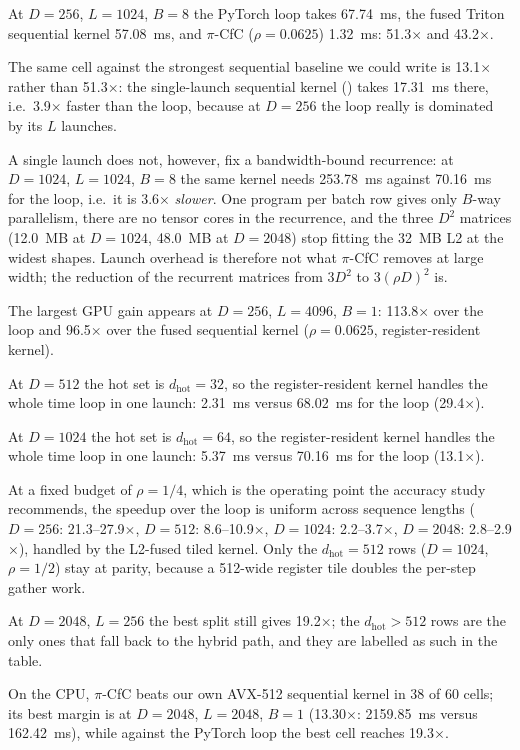 At $D=256$, $L=1024$, $B=8$ the PyTorch loop takes 67.74~ms, the fused Triton sequential kernel 57.08~ms, and $\pi$-CfC ($\rho=0.0625$) 1.32~ms: 51.3$\times$ and 43.2$\times$.

The same cell against the strongest sequential baseline we could write is 13.1$\times$ rather than 51.3$\times$: the single-launch sequential kernel () takes 17.31~ms there, i.e.\ 3.9$\times$ faster than the loop, because at $D=256$ the loop really is dominated by its $L$ launches.

A single launch does not, however, fix a bandwidth-bound recurrence: at $D=1024$, $L=1024$, $B=8$ the same kernel needs 253.78~ms against 70.16~ms for the loop, i.e.\ it is 3.6$\times$ \emph{slower}. One program per batch row gives only $B$-way parallelism, there are no tensor cores in the recurrence, and the three $D^2$ matrices (12.0~MB at $D=1024$, 48.0~MB at $D=2048$) stop fitting the 32~MB L2 at the widest shapes. Launch overhead is therefore not what $\pi$-CfC removes at large width; the reduction of the recurrent matrices from $3D^2$ to $3(\rho D)^2$ is.

The largest GPU gain appears at $D=256$, $L=4096$, $B=1$: 113.8$\times$ over the loop and 96.5$\times$ over the fused sequential kernel ($\rho=0.0625$, register-resident kernel).

At $D=512$ the hot set is $d_{\text{hot}}=32$, so the register-resident kernel handles the whole time loop in one launch: 2.31~ms versus 68.02~ms for the loop (29.4$\times$).

At $D=1024$ the hot set is $d_{\text{hot}}=64$, so the register-resident kernel handles the whole time loop in one launch: 5.37~ms versus 70.16~ms for the loop (13.1$\times$).

At a fixed budget of $\rho=1/4$, which is the operating point the accuracy study recommends, the speedup over the loop is uniform across sequence lengths ($D=256$: 21.3--27.9$\times$, $D=512$: 8.6--10.9$\times$, $D=1024$: 2.2--3.7$\times$, $D=2048$: 2.8--2.9$\times$), handled by the L2-fused tiled kernel. Only the $d_{\text{hot}}=512$ rows ($D=1024$, $\rho=1/2$) stay at parity, because a 512-wide register tile doubles the per-step gather work.

At $D=2048$, $L=256$ the best split still gives 19.2$\times$; the $d_{\text{hot}}>512$ rows are the only ones that fall back to the hybrid path, and they are labelled as such in the table.

On the CPU, $\pi$-CfC beats our own AVX-512 sequential kernel in 38 of 60 cells; its best margin is at $D=2048$, $L=2048$, $B=1$ (13.30$\times$: 2159.85~ms versus 162.42~ms), while against the PyTorch loop the best cell reaches 19.3$\times$.

